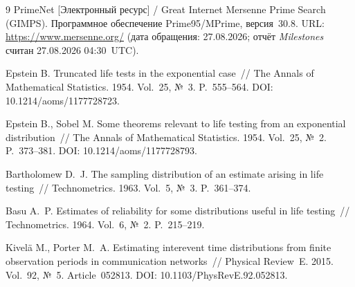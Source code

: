 \documentclass[11pt,a4paper]{article}
\theoremstyle{plain}
\theoremstyle{remark}
\begin{document}
\begin{thebibliography}{9}
 PrimeNet [Электронный ресурс] / Great Internet Mersenne Prime
Search (GIMPS). Программное обеспечение Prime95/MPrime, версия~30.8.
URL: \url{https://www.mersenne.org/} (дата обращения: 27.08.2026;
отчёт \emph{Milestones} считан 27.08.2026 04:30~UTC).

 Epstein B. Truncated life tests in the exponential
case~// The Annals of Mathematical Statistics. 1954. Vol.~25, №~3. P.~555--564.
DOI: 10.1214/aoms/1177728723.

 Epstein B., Sobel M. Some theorems relevant to life
testing from an exponential distribution~// The Annals of Mathematical
Statistics. 1954. Vol.~25, №~2. P.~373--381. DOI: 10.1214/aoms/1177728793.

 Bartholomew D.~J. The sampling distribution of an
estimate arising in life testing~// Technometrics. 1963. Vol.~5, №~3.
P.~361--374.

 Basu A.~P. Estimates of reliability for some distributions
useful in life testing~// Technometrics. 1964. Vol.~6, №~2. P.~215--219.

 Kivel\"{a} M., Porter M.~A. Estimating interevent time
distributions from finite observation periods in communication networks~//
Physical Review~E. 2015. Vol.~92, №~5. Article~052813.
DOI: 10.1103/PhysRevE.92.052813.

\end{thebibliography}
\end{document}
